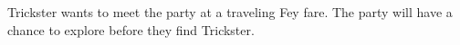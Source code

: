 Trickster wants to meet the party at a traveling Fey fare.
The party will have a chance to explore before they find Trickster.

